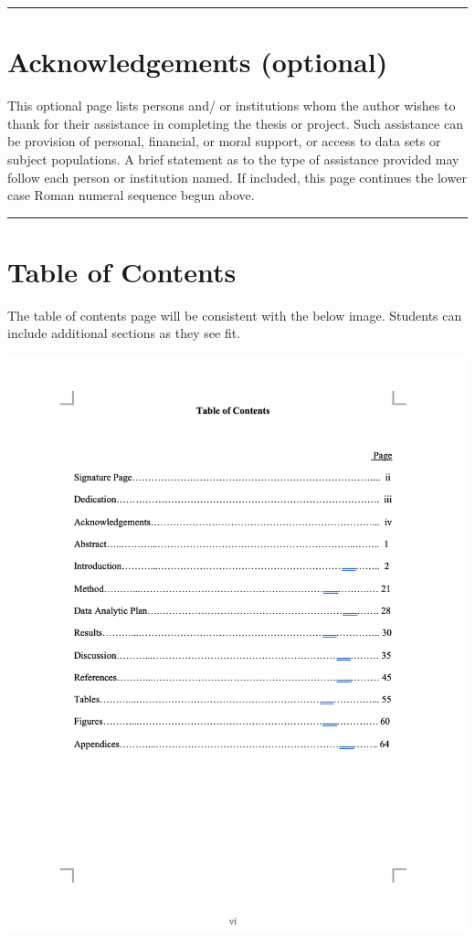 \documentclass[openany]{book}
\begin{document}
\begin{center}\rule{0.5\linewidth}{0.5pt}\end{center}

\hypertarget{acknowledgements-optional}{%
\section{Acknowledgements (optional)}\label{acknowledgements-optional}}

This optional page lists persons and/ or institutions whom the author wishes to thank for their assistance in completing the thesis or project. Such assistance can be provision of personal, financial, or moral support, or access to data sets or subject populations. A brief statement as to the type of assistance provided may follow each person or institution named. If included, this page continues the lower case Roman numeral sequence begun above.

\begin{center}\rule{0.5\linewidth}{0.5pt}\end{center}

\hypertarget{table-of-contents}{%
\section{Table of Contents}\label{table-of-contents}}

The table of contents page will be consistent with the below image. Students can include additional sections as they see fit.

\includegraphics{images/tablecontents.png}
\end{document}
